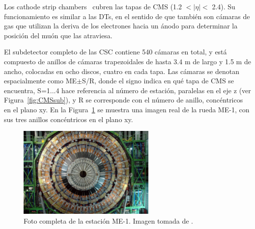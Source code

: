 Los cathode strip chambers~\cite{CSCperformance} cubren las tapas de CMS (1.2 $< \lvert \eta \rvert <$ 2.4). Su funcionamiento es similar a las DTs, en el sentido de que tambi\'en son c\'amaras de gas que utilizan la deriva de los electrones hacia un \'anodo para determinar la posici\'on del mu\'on que las atraviesa.

El subdetector completo de las CSC contiene 540 c\'amaras en total, y est\'a compuesto de anillos de c\'amaras trapezoidales de hasta 3.4 m de largo y 1.5 m de ancho, colocadas en ocho discos, cuatro en cada tapa. Las c\'amaras se denotan espacialmente como ME$\pm$S/R, donde el signo indica en qu\'e tapa de CMS se encuentra, S=1...4 hace referencia al n\'umero de estaci\'on, paralelas en el eje z (ver Figura~\ref{fig:CMSsub}), y R se corresponde con el n\'umero de anillo, conc\'entricos en el plano xy. En la Figura~\ref{fig:CSC_MEm1} se muestra una imagen real de la rueda ME-1, con sus tres anillos conc\'entricos en el plano xy. \\

\begin{figure}[h]
\centering
\includegraphics[width=0.60\textwidth]{figures/CSC_MEm1.jpg}
\caption{Foto completa de la estaci\'on ME-1. Imagen tomada de \cite{Breedon:1431505}.}
\label{fig:CSC_MEm1}        
\end{figure}


